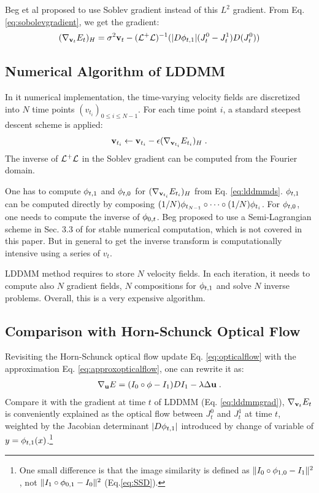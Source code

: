\documentclass[letterpaper,12pt]{article}
\begin{document}
Beg et al proposed to use Soblev gradient instead of this $L^2$ gradient. From Eq. \ref{eq:sobolevgradient}, we get the gradient:
\begin{align}
(\nabla_{\mathbf{v}_t} E_t)_H = \sigma^2 \mathbf{v}_t - (\mathcal{L}^+\mathcal{L})^{-1}(|D\phi_{t,1}|(J_t^0 - J_t^1)D(J_t^0))
\end{align}

\subsection{Numerical Algorithm of LDDMM}
\label{sec:lddmmalg}
In it numerical implementation, the time-varying velocity fields are discretized into $N$ time points $(v_{t_i} )_{0 \leq i \leq N-1}$. For each time point $i$, a standard steepest descent scheme is applied:
\begin{align}
\mathbf{v}_{t_i}  \leftarrow \mathbf{v}_{t_i} - \epsilon (\nabla_{\mathbf{v}_{t_i}} E_{t_i})_H \; .
\end{align}
The inverse of $\mathcal{L}^+\mathcal{L}$ in the Soblev gradient can be computed from the Fourier domain.


One has to compute $\phi_{t,1}$ and $\phi_{t,0}$ for $(\nabla_{\mathbf{v}_{t_i}} E_{t_i})_H$ from Eq. \ref{eq:lddmmds}. $\phi_{t,1}$ can be computed directly by composing $ (1/N)\phi_{t_{N-1}} \circ \cdots \circ (1/N) \phi_{t_{i}}$. For $\phi_{t,0}$, one needs to compute the inverse of $\phi_{0,t}$. Beg proposed to use a  Semi-Lagrangian scheme in Sec. 3.3 of \cite{Beg2005Computing} for stable numerical computation, which is not covered in this paper. But in general to get the inverse transform is computationally intensive using a series of $v_t$. 

LDDMM method requires to store $N$ velocity fields. In each iteration, it needs to compute also $N$ gradient fields, $N$ compositions for $\phi_{t,1}$ and solve $N$ inverse problems. Overall, this is a very expensive algorithm.


\subsection{Comparison with Horn-Schunck Optical Flow}

Revisiting the Horn-Schunck optical flow update Eq. \ref{eq:opticalflow} with the approximation Eq. \ref{eq:approxopticalflow}, one can rewrite it as:
\begin{align}
\nabla_{\mathbf{u}}E = (I_0 \circ \phi - I_1) DI_1 - \lambda \Delta \mathbf{u} \;.
\end{align}
Compare it with the gradient at time $t$ of LDDMM (Eq. \ref{eq:lddmmgrad}), $\nabla_{\mathbf{v}_t} E_t$ is conveniently explained as the optical flow between $J_t^0$ and $J_t^1$ at time $t$, weighted by the Jacobian determinant $|D\phi_{t,1}|$ introduced by change of variable of $ y = \phi_{t,1}(x)$.\footnote{One small difference is that the image similarity is defined as $\|I_0 \circ \phi_{1,0} - I_1\|^2$, not $\|I_1 \circ \phi_{0,1} - I_0\|^2$ (Eq.\ref{eq:SSD}). } 
\end{document}
